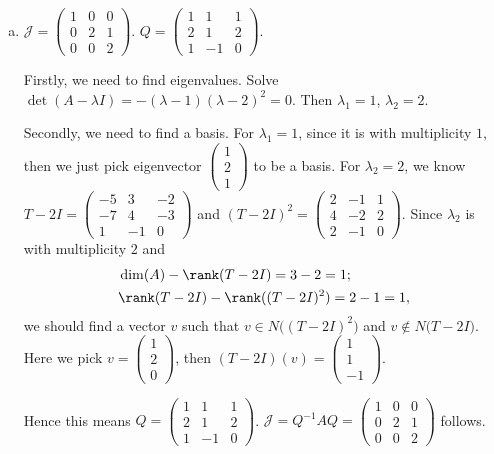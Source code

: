 \begin{Exercise}
\begin{enumerate}[(a)]
\item
\begin{answer}
$\mathcal{J} = \begin{pmatrix}
1 & 0 & 0 \\
0 & 2 & 1 \\
0 & 0 & 2
\end{pmatrix}$. $Q = \begin{pmatrix}
1 & 1 & 1 \\
2 & 1 & 2 \\
1 & -1 & 0
\end{pmatrix}$. 
\end{answer}
\begin{solution}
Firstly, we need to find eigenvalues. Solve $\det(A-\lambda I) = -(\lambda-1)(\lambda-2)^2 = 0$. Then $\lambda_1 = 1$, $\lambda_2 = 2$.

Secondly, we need to find a basis. For $\lambda_1 = 1$, since it is with multiplicity $1$, then we just pick eigenvector $\begin{pmatrix}
1 \\
2 \\
1
\end{pmatrix}$ to be a basis. For $\lambda_2 = 2$, we know $T-2I = \begin{pmatrix}
-5 & 3 & -2 \\
-7 & 4 & -3 \\
1 & -1 & 0
\end{pmatrix}$ and $(T-2I)^2 = \begin{pmatrix}
2 & -1 & 1 \\
4 & -2 & 2 \\
2 & -1 & 0
\end{pmatrix}$. Since $\lambda_2$ is with multiplicity $2$ and
\begin{align*}
&\dim(A)-\rank(T-2I) = 3-2=1; \\
&\rank(T-2I)-\rank((T-2I)^2) = 2-1 = 1,
\end{align*}
we should find a vector $v$ such that $v\in N\big((T-2I)^2\big)$ and $v\notin N\big(T-2I\big)$. Here we pick $v = \begin{pmatrix}
1 \\
2 \\
0
\end{pmatrix}$, then $(T-2I)(v) = \begin{pmatrix}
1 \\
1 \\
-1
\end{pmatrix}$. 

Hence this means $Q = \begin{pmatrix}
1 & 1 & 1 \\
2 & 1 & 2 \\
1 & -1 & 0
\end{pmatrix}$. $\mathcal{J} = Q^{-1} A Q = \begin{pmatrix}
1 & 0 & 0 \\
0 & 2 & 1 \\
0 & 0 & 2
\end{pmatrix}$ follows.
\end{solution}
\end{enumerate}
\end{Exercise}